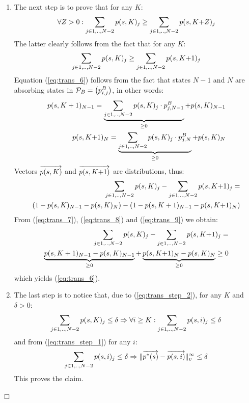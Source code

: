 \documentclass[a4paper,11pt]{article}
\newenvironment{proof}{\trivlist \item[\hskip \labelsep{\bf Proof}]}{\hfill\hbox{$\Box$}\endtrivlist}
\begin{document}
\begin{proof}
\begin{enumerate}
			\item The next step is to prove that for any $K$:
				\begin{equation}
					\forall Z > 0 : \sum_{j \in 1,..,N-2} p(s,K)_{j} \geq \sum_{j \in 1,..,N-2} p(s,K{+}Z)_{j}
					\label{eq:trans_step_2}
				\end{equation}
				The latter clearly follows from the fact that for any $K$:
				\begin{equation}
					\sum_{j \in 1,..,N-2} p(s,K)_{j} \geq \sum_{j \in 1,..,N-2} p(s,K{+}1)_{j} \label{eq:trans_6}
				\end{equation}
				Equation (\ref{eq:trans_6}) follows from the fact that states $N-1$ and $N$ are absorbing states in $\mathcal{P}_{B}=\left( p^{B}_{i,j} \right)$, in other words:
				\begin{eqnarray}
					p(s,K+1)_{N{-}1} = \underbrace{\sum_{j \in 1,..,N-2} p(s,K)_{j} \cdot p^{B}_{j,N-1}}_{\geq 0} + p(s,K)_{N{-}1} \label{eq:trans_7} \\
					p(s,K{+}1)_{N} = \underbrace{\sum_{j \in 1,..,N-2} p(s,K)_{j} \cdot p^{B}_{j,N}}_{\geq 0} + p(s,K)_{N} \label{eq:trans_8}
				\end{eqnarray}
				Vectors $\overrightarrow{p(s,K)}$ and $\overrightarrow{p(s,K{+}1)}$ are distributions, thus:
				\begin{eqnarray}
					\sum_{j \in 1,..,N-2} p(s,K)_{j} - \sum_{j \in 1,..,N-2} p(s,K{+}1)_{j} = \nonumber \\
					\left(1 - p(s,K)_{N{-}1} - p(s,K)_{N} \right) - \left(1 - p(s,K+1)_{N{-}1} - p(s,K{+}1)_{N} \right) \label{eq:trans_9}
				\end{eqnarray}
				From (\ref{eq:trans_7}), (\ref{eq:trans_8}) and (\ref{eq:trans_9}) we obtain:
				\begin{eqnarray}
					\sum_{j \in 1,..,N-2} p(s,K)_{j} - \sum_{j \in 1,..,N-2} p(s,K{+}1)_{j} = \nonumber \\ \underbrace{p(s,K+1)_{N{-}1} - p(s,K)_{N{-}1}}_{\geq 0} + \underbrace{ p(s,K{+}1)_{N} -  p(s,K)_{N}}_{\geq 0} \geq 0 \nonumber
				\end{eqnarray}
				which yields (\ref{eq:trans_6}).
			
			\item The last step is to notice that, due to (\ref{eq:trans_step_2}), for any $K$ and $\delta > 0$:
				\[
					 \sum_{j \in 1,..,N-2} p(s,K)_{j} \leq \delta \Rightarrow \forall i \geq K : \sum_{j \in 1,..,N-2} p(s,i)_{j} \leq \delta
				\]
				and from (\ref{eq:trans_step_1}) for any $i$:
				\[
					\sum_{j \in 1,..,N-2} p(s,i)_{j} \leq \delta \Rightarrow \lVert  \overrightarrow{p^{*}(s)} - \overrightarrow{p(s,i)}  \rVert_{v}^{\infty} \leq \delta
				\]
				This proves the claim. 
		\end{enumerate}
	\end{proof}
	
\end{document}
